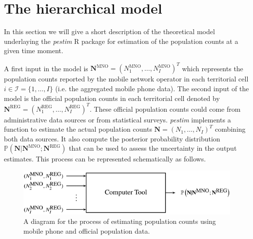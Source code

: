 \documentclass[12pt,leqno]{article}
\begin{document}
\section{The hierarchical model}\label{model}

In this section we will give a short description of the theoretical model underlaying the {\textit{pestim}} R package for estimation of the population counts at a given time moment.

A first input in the model is $\mathbf{N}^{\textrm{MNO}}=(N_{1}^{\textrm{MNO}}, \dots, N_{I}^{\textrm{MNO}})^{T}$ which represents the population counts reported by the mobile network operator in each territorial cell $i\in\mathcal{I}=\{1,\dots,I\}$ (i.e. the aggregated mobile phone data).  The second input of the model is the official population counts in each territorial cell denoted by 
$\mathbf{N}^{\textrm{REG}}=(N_{1}^{\textrm{REG}}, \dots, N_{I}^{\textrm{REG}})^{T}$. These official population counts could come from administrative data sources or from statistical surveys.
 {\textit{pestim}} implements a function to estimate the actual population counts $\mathbf{N}=(N_{1}, \dots, N_{I})^{T}$ combining both data sources. It also compute the posterior probability distribution 
$\mathbb{P}\left(\mathbf{N}|\mathbf{N}^{\textrm{MNO}};\mathbf{N}^{\textrm{REG}}\right)$ 
that can be used to assess the uncertainty in the output estimates.
This process can be represented schematically as follows.

\begin{figure}[htbp]
\centering
\includegraphics{Tool.png}
\caption{\label{Tool} A diagram for the process of estimating population counts using mobile phone and official population data.}
\end{figure}
\end{document}
